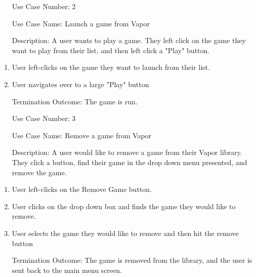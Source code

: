 \documentclass[10pt,conference,onecolumn,compsoc]{IEEEtran}
\begin{document}
\begin{itemize}
\item[Use Case Number:] 2
\item[Use Case Name:] Launch a game from Vapor
\item[Description:] A user wants to play a game. They left click on the game they want to play from their list, and then left click a "Play" button.
\end{itemize}

\begin{enumerate}
\item User left-clicks on the game they want to launch from their list.
\item User navigates over to a large "Play" button
\item[Termination Outcome:] The game is run.
\end{enumerate}

\begin{itemize}
\item[Use Case Number:] 3
\item[Use Case Name:] Remove a game from Vapor
\item[Description:] A user would like to remove a game from their Vapor library. They click a button, find their game in the drop down menu presented, and remove the game.
\end{itemize}

\begin{enumerate}
\item User left-clicks on the Remove Game button.
\item User clicks on the drop down box and finds the game they would like to remove.
\item User selects the game they would like to remove and then hit the remove button
\item[Termination Outcome:] The game is removed from the library, and the user is sent back to the main menu screen.
\end{enumerate}

%
%
%
\end{document}
